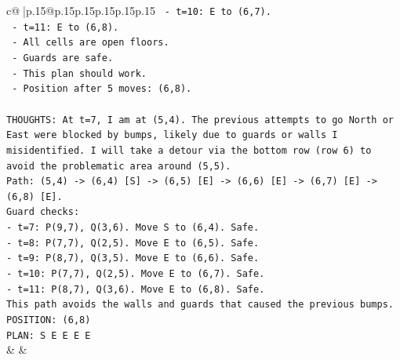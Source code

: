 \documentclass{article}
\begin{document}
{\begin{supertabular}{c@{$\;$}|p{.15\linewidth}@{}p{.15\linewidth}p{.15\linewidth}p{.15\linewidth}p{.15\linewidth}p{.15\linewidth}}
{{{\texttt{        {-} t=10: E to (6,7).} \\
\texttt{        {-} t=11: E to (6,8).} \\
\texttt{        {-} All cells are open floors.} \\
\texttt{        {-} Guards are safe.} \\
\texttt{        {-} This plan should work.} \\
\texttt{        {-} Position after 5 moves: (6,8).} \\
\\ 
\texttt{THOUGHTS: At t=7, I am at (5,4). The previous attempts to go North or East were blocked by bumps, likely due to guards or walls I misidentified. I will take a detour via the bottom row (row 6) to avoid the problematic area around (5,5).} \\
\texttt{Path: (5,4) {-}> (6,4) {[}S{]} {-}> (6,5) {[}E{]} {-}> (6,6) {[}E{]} {-}> (6,7) {[}E{]} {-}> (6,8) {[}E{]}.} \\
\texttt{Guard checks:} \\
\texttt{{-} t=7: P(9,7), Q(3,6). Move S to (6,4). Safe.} \\
\texttt{{-} t=8: P(7,7), Q(2,5). Move E to (6,5). Safe.} \\
\texttt{{-} t=9: P(8,7), Q(3,5). Move E to (6,6). Safe.} \\
\texttt{{-} t=10: P(7,7), Q(2,5). Move E to (6,7). Safe.} \\
\texttt{{-} t=11: P(8,7), Q(3,6). Move E to (6,8). Safe.} \\
\texttt{This path avoids the walls and guards that caused the previous bumps.} \\
\texttt{POSITION: (6,8)} \\
\texttt{PLAN: S E E E E} \\
            }
        }
    }
    & & \\ \\


\end{supertabular}}
\end{document}
